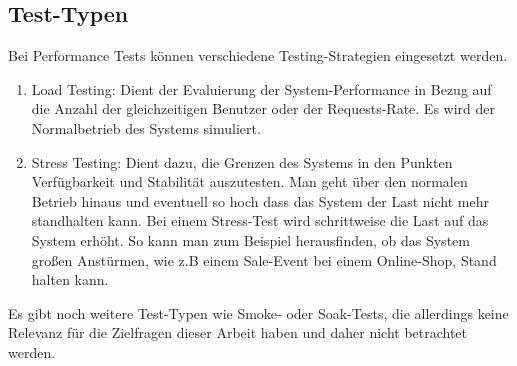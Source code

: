 \subsection{Test-Typen}
Bei Performance Tests können verschiedene Testing-Strategien eingesetzt werden.
\begin{enumerate}
    \item Load Testing: Dient der Evaluierung der System-Performance in Bezug auf die Anzahl der gleichzeitigen Benutzer oder der Requests-Rate. Es wird der Normalbetrieb des Systems simuliert.
    
    \item Stress Testing: Dient dazu, die Grenzen des Systems in den Punkten Verfügbarkeit und  Stabilität auszutesten. Man geht über den normalen Betrieb hinaus und eventuell so hoch dass das System der Last nicht mehr standhalten kann. Bei einem Stress-Test wird schrittweise die Last auf das System erhöht. So kann man zum Beispiel herausfinden, ob das System großen Anstürmen, wie z.B einem Sale-Event bei einem Online-Shop, Stand halten kann.
\end{enumerate}

Es gibt noch weitere Test-Typen wie Smoke- oder Soak-Tests, die allerdings keine Relevanz für die Zielfragen dieser Arbeit haben und daher nicht betrachtet werden.

